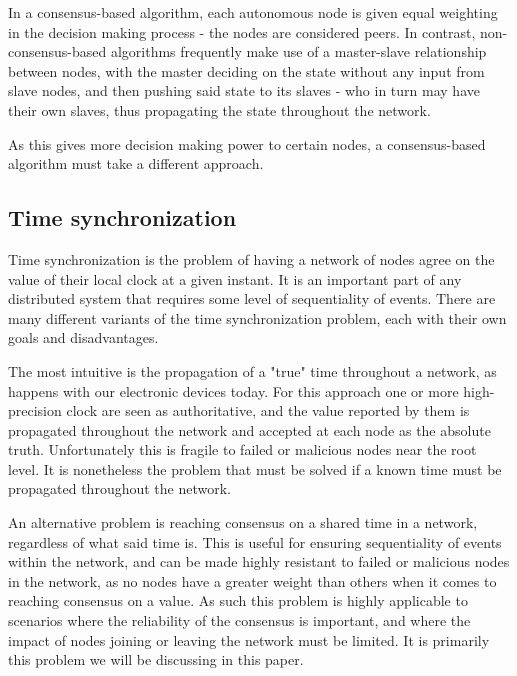 \documentclass[a4paper,12pt]{article}
\begin{document}
In a consensus-based algorithm, each autonomous node is given equal weighting in the decision making process - the nodes are considered peers. In contrast, non-consensus-based algorithms frequently make use of a master-slave relationship between nodes, with the master deciding on the state without any input from slave nodes, and then pushing said state to its slaves - who in turn may have their own slaves, thus propagating the state throughout the network.

As this gives more decision making power to certain nodes, a consensus-based algorithm must take a different approach.

\subsection{Time synchronization} %


Time synchronization is the problem of having a network of nodes agree on the value of their local clock at a given instant. It is an important part of any distributed system that requires some level of sequentiality of events. There are many different variants of the time synchronization problem, each with their own goals and disadvantages.

The most intuitive is the propagation of a "true" time throughout a network, as happens with our electronic devices today. For this approach one or more high-precision clock are seen as authoritative, and the value reported by them is propagated throughout the network and accepted at each node as the absolute truth. Unfortunately this is fragile to failed or malicious nodes near the root level. It is nonetheless the problem that must be solved if a known time must be propagated throughout the network.

An alternative problem is reaching consensus on a shared time in a network, regardless of what said time is. This is useful for ensuring sequentiality of events within the network, and can be made highly resistant to failed or malicious nodes in the network, as no nodes have a greater weight than others when it comes to reaching consensus on a value. As such this problem is highly applicable to scenarios where the reliability of the consensus is important, and where the impact of nodes joining or leaving the network must be limited. It is primarily this problem we will be discussing in this paper.
\end{document}

